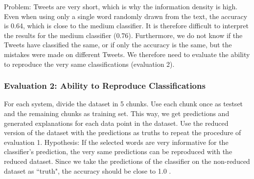 Problem: Tweets are very short, which is why the information density is high. Even when using only a single word randomly drawn from the text, the accuracy is 0.64, which is close to the medium classifier. It is therefore difficult to interpret the results for the medium classifier (0.76). Furthermore, we do not know if the Tweets have classified the same, or if only the accuracy is the same, but the mistakes were made on different Tweets. We therefore need to evaluate the ability to reproduce the very same classifications (evaluation 2).


\subsubsection{Evaluation 2: Ability to Reproduce Classifications}
For each system, divide the dataset in 5 chunks. Use each chunk once as testset and the remaining chunks as training set. This way, we get predictions and generated explanations for each data point in the dataset. Use the reduced version of the dataset with the predictions as truths to repeat the procedure of evaluation 1. Hypothesis: If the selected words are very informative for the classifier's prediction, the very same predictions can be reproduced with the reduced dataset. Since we take the predictions of the classifier on the non-reduced dataset as ``truth", the accuracy should be close to 1.0 .
